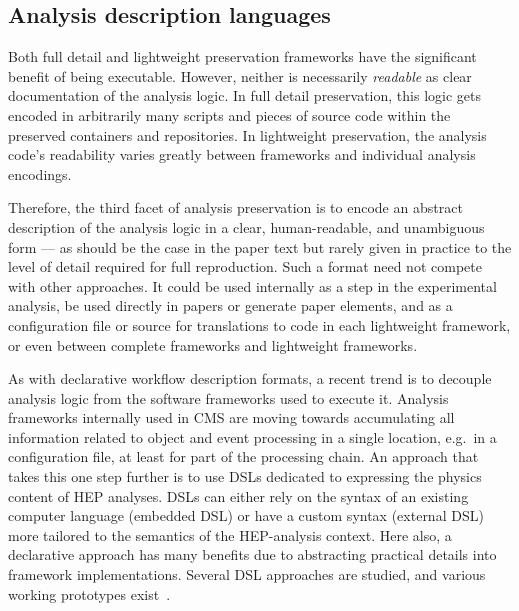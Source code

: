 \documentclass[11pt]{article}
\begin{document}



\subsection{Analysis description languages}

Both full detail and lightweight preservation frameworks have the significant benefit of being executable. %
However, neither is necessarily \emph{readable} as clear documentation of the analysis logic.
In full detail preservation, this logic gets encoded in arbitrarily many scripts and pieces of source code within the preserved containers and repositories.
In lightweight preservation, the analysis code's readability varies greatly between frameworks and individual analysis encodings.

Therefore, the third facet of analysis preservation is to encode an abstract description of the analysis logic in a clear, human-readable, and unambiguous form --- as should be the case in the paper text but rarely given in practice to the level of detail required for full reproduction. Such a format need not compete with other approaches. It could be used internally as a step in the experimental analysis, be used directly in papers or generate paper elements, and as a configuration file or source for translations to code in each lightweight framework, or even between complete frameworks and lightweight frameworks.

As with declarative workflow description formats, a recent trend is to decouple analysis logic from the software frameworks used to execute it. Analysis frameworks internally used in \gls{CMS} 
are moving towards accumulating all information related to object and event processing in a single location, e.g.~in a configuration file, at least for part of the processing chain. An approach that takes this one step further is to use \glspl{DSL} dedicated to expressing the physics content of \gls{HEP} analyses. \glspl{DSL} can either rely on the syntax of an existing computer language (embedded \gls{DSL}) or have a custom syntax (external \gls{DSL}) more tailored to the semantics of the \gls{HEP}-analysis context. Here also, a declarative approach has many benefits due to abstracting practical details into framework implementations. Several \gls{DSL} approaches are studied, and various working prototypes exist~\cite{Sekmen:2020vph}. 
\end{document}
